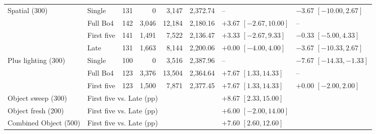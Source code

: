 \begin{table}[t]
\begin{tabular}{@{}llrrrrll@{}}
\addlinespace
Spatial (300) & Single & 131 & 0 & 3,147 & 2,372.74 & -- & $-3.67$ $[-10.00, 2.67]$ \\
 & Full Bo4 & 142 & 3,046 & 12,184 & 2,180.16 & $+3.67$ $[-2.67, 10.00]$ & -- \\
 & First five & 141 & 1,491 & 7,522 & 2,136.47 & $+3.33$ $[-2.67, 9.33]$ & $-0.33$ $[-5.00, 4.33]$ \\
 & Late & 131 & 1,663 & 8,144 & 2,200.06 & $+0.00$ $[-4.00, 4.00]$ & $-3.67$ $[-10.33, 2.67]$ \\
\addlinespace
Plus lighting (300) & Single & 100 & 0 & 3,516 & 2,387.96 & -- & $-7.67$ $[-14.33, -1.33]$ \\
 & Full Bo4 & 123 & 3,376 & 13,504 & 2,364.64 & $+7.67$ $[1.33, 14.33]$ & -- \\
 & First five & 123 & 1,500 & 7,871 & 2,377.45 & $+7.67$ $[1.33, 14.33]$ & $+0.00$ $[-2.00, 2.00]$ \\
\midrule
Object sweep (300) & \multicolumn{5}{l}{First five vs. Late (pp)} & \multicolumn{2}{l}{$+8.67$ $[2.33, 15.00]$} \\
Object fresh (200) & \multicolumn{5}{l}{First five vs. Late (pp)} & \multicolumn{2}{l}{$+6.00$ $[-2.00, 14.00]$} \\
Combined Object (500) & \multicolumn{5}{l}{First five vs. Late (pp)} & \multicolumn{2}{l}{$+7.60$ $[2.60, 12.60]$} \\
\bottomrule
\end{tabular}
\end{table}
